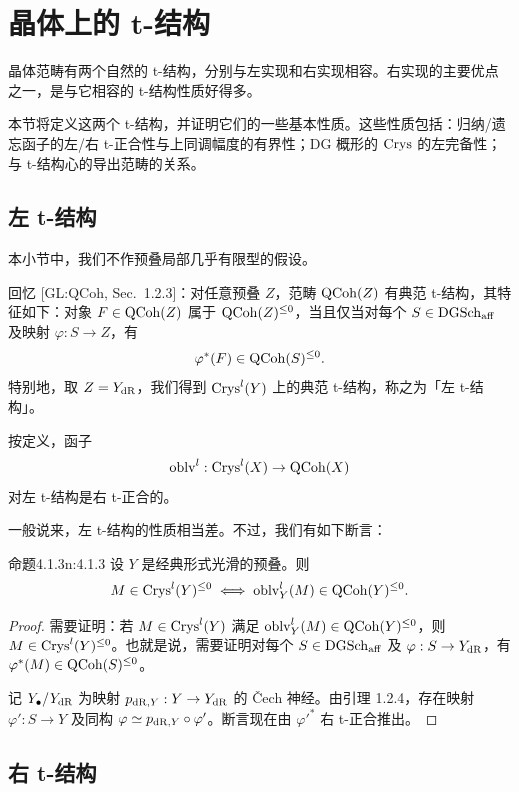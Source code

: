 \chapter{晶体上的 t-结构}

晶体范畴有两个自然的 t-结构，分别与左实现和右实现相容。右实现的主要优点之一，是与它相容的 t-结构性质好得多。

本节将定义这两个 t-结构，并证明它们的一些基本性质。这些性质包括：归纳/遗忘函子的左/右 t-正合性与上同调幅度的有界性；DG 概形的 $\mathrm{Crys}$ 的左完备性；与 t-结构心的导出范畴的关系。

\section{左 t-结构}

本小节中，我们不作预叠局部几乎有限型的假设。

回忆 [GL:QCoh, Sec.~1.2.3]：对任意预叠 $Z$，范畴 $\mathrm{QCoh}(Z)$ 有典范 t-结构，其特征如下：对象 $F\in\mathrm{QCoh}(Z)$ 属于 $\mathrm{QCoh}(Z)^{\leq 0}$，当且仅当对每个 $S\in\mathrm{DGSch}_{\mathrm{aff}}$ 及映射 $\varphi:S\to Z$，有
\[
\varphi^*(F)\in\mathrm{QCoh}(S)^{\leq 0}.
\]
特别地，取 $Z=Y_{\mathrm{dR}}$，我们得到 $\mathrm{Crys}^l(Y)$ 上的典范 t-结构，称之为「左 t-结构」。

按定义，函子
\[
\mathrm{oblv}^l:\mathrm{Crys}^l(X)\to\mathrm{QCoh}(X)
\]
对左 t-结构是右 t-正合的。

一般说来，左 t-结构的性质相当差。不过，我们有如下断言：

\begin{othm}{命题}{4.1.3}{n:4.1.3}
设 $Y$ 是经典形式光滑的预叠。则
\[
M\in\mathrm{Crys}^l(Y)^{\leq 0}\iff \mathrm{oblv}^l_Y(M)\in\mathrm{QCoh}(Y)^{\leq 0}.
\]
\end{othm}

\begin{proof}
需要证明：若 $M\in\mathrm{Crys}^l(Y)$ 满足 $\mathrm{oblv}^l_Y(M)\in\mathrm{QCoh}(Y)^{\leq 0}$，则 $M\in\mathrm{Crys}^l(Y)^{\leq 0}$。也就是说，需要证明对每个 $S\in\mathrm{DGSch}_{\mathrm{aff}}$ 及 $\varphi:S\to Y_{\mathrm{dR}}$，有 $\varphi^*(M)\in\mathrm{QCoh}(S)^{\leq 0}$。

记 $Y_\bullet/Y_{\mathrm{dR}}$ 为映射 $p_{\mathrm{dR},Y}:Y\to Y_{\mathrm{dR}}$ 的 Čech 神经。由引理 1.2.4，存在映射 $\varphi':S\to Y$ 及同构 $\varphi\simeq p_{\mathrm{dR},Y}\circ\varphi'$。断言现在由 $\varphi'^*$ 右 t-正合推出。
\end{proof}

\section{右 t-结构}

